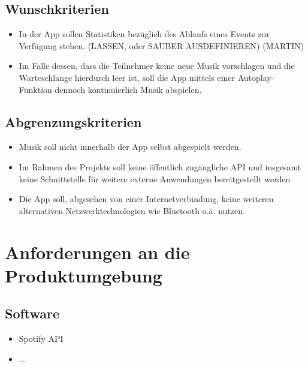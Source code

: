 \documentclass[oneside, ngerman]{sdqtechreport}
\begin{document}
\section{Wunschkriterien}
\label{sec:Zielbestimmungen:Wunschkriterien}
\begin{itemize}
    \item In der App sollen Statistiken bezüglich des Ablaufs eines Events zur Verfügung stehen. (LASSEN, oder SAUBER AUSDEFINIEREN) (MARTIN)
    \item Im Falle dessen, dass die Teilnehmer keine neue Musik vorschlagen und die Warteschlange hierdurch leer ist, soll die App mittels einer Autoplay-Funktion dennoch kontinuierlich Musik abspielen.

\end{itemize}

\section{Abgrenzungskriterien}
\label{sec:Zielbestimmungen:Abgrenzungskriterien}
\begin{itemize}
    \item Musik soll nicht innerhalb der App selbst abgespielt werden.
    \item Im Rahmen des Projekts soll keine öffentlich zugängliche API und insgesamt keine Schnittstelle für weitere externe Anwendungen bereitgestellt werden
    \item Die App soll, abgesehen von einer Internetverbindung, keine weiteren alternativen Netzwerktechnologien wie Bluetooth o.ä. nutzen.

\end{itemize}



\chapter{Anforderungen an die Produktumgebung}
\label{chap:Produktumgebung}

\section{Software}
\label{sec:Produktumgebung:Software}

\begin{itemize}
    \item Spotify API
    \item ...
\end{itemize}
\end{document}
